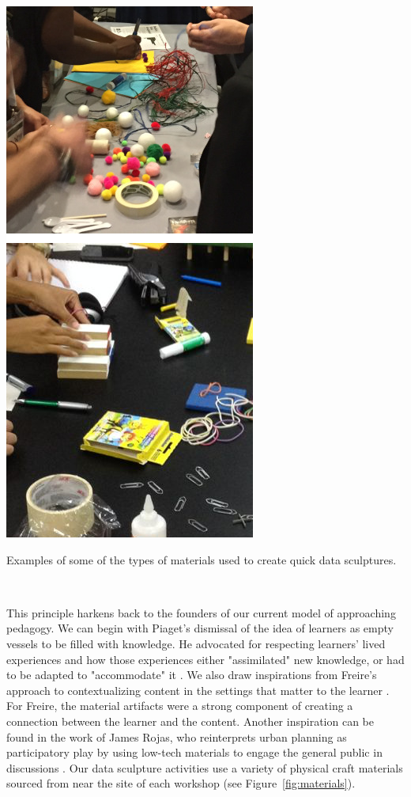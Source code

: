 \documentclass{sigchi-ext}
\begin{document}
\begin{marginfigure}[-15pc]
  \begin{minipage}{\marginparwidth}
    \centering
    \includegraphics[width=1.0\marginparwidth]{figures/materials}
    \caption{Examples of some of the types of materials used to create quick data sculptures.}~\label{fig:materials}
  \end{minipage}
\end{marginfigure}

This principle harkens back to the founders of our current model of approaching pedagogy.  We can begin with Piaget's dismissal of the idea of learners as empty vessels to be filled with knowledge. He advocated for respecting learners' lived experiences and how those experiences either "assimilated" new knowledge, or had to be adapted to "accommodate" it \cite{Piaget_1952}. We also draw inspirations from Freire's approach to contextualizing content in the settings that matter to the learner \cite{Freire_1968}. For Freire, the material artifacts were a strong component of creating a connection between the learner and the content.  Another inspiration can be found in the work of James Rojas, who reinterprets urban planning as participatory play by using low-tech materials to engage the general public in discussions \cite{Rojas_Kamp_2016}. Our data sculpture activities use a variety of physical craft materials sourced from near the site of each workshop (see Figure~\ref{fig:materials}).
\end{document}
